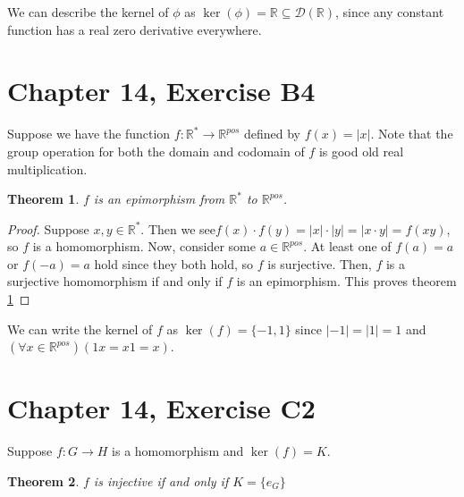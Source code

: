 \documentclass[12pt]{article}
\newcommand{\reals}{\mathbb{R}}
\newcommand{\dreals}{\mathcal{D}(\reals)}
\newtheorem{thm}{Theorem}
\begin{document}
We can describe the kernel of $\phi$ as
$\ker(\phi) = \reals \subseteq \dreals$,
since any constant function has a real zero derivative everywhere.

\section{Chapter 14, Exercise B4}

Suppose we have
the function $f:\reals^* \to \reals^{pos}$
defined by $f(x) = |x|$.
Note that the group operation
for both the domain and codomain of $f$
is good old real multiplication.

\begin{thm} \label{thm2}
	$f$ is an epimorphism from $\reals^*$ to $\reals^{pos}$.
\end{thm}

\begin{proof}
	Suppose $x,y \in \reals^*.$
	Then we see$f(x) \cdot f(y) = |x| \cdot |y| = |x \cdot y| = f(xy)$,
	so $f$ is a homomorphism.
	Now, consider some $a \in \reals^{pos}$.
	At least one of $f(a) = a$ or $f(-a) = a$ hold since they both hold,
	so $f$ is surjective.
	Then, $f$ is a surjective homomorphism
	if and only if
	$f$ is an epimorphism.
	This proves theorem \ref{thm2}
\end{proof}

We can write the kernel of $f$ as
$\ker(f) = \{ -1, 1\}$ since $|-1| = |1| = 1$
and $(\forall x \in \reals^{pos})(1x = x1 = x)$.

\section{Chapter 14, Exercise C2}

Suppose $f:G \to H$ is a homomorphism
and $\ker(f) = K$.

\begin{thm} \label{thm3}
	$f$ is injective if and only if $K = \{ e_G \}$
\end{thm}
\end{document}
